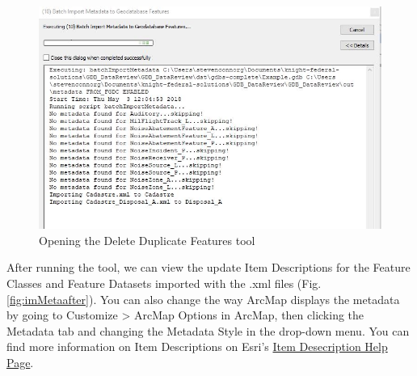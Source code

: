 \documentclass[openany]{book}
\theoremstyle{definition}
\theoremstyle{definition}
\theoremstyle{definition}
\theoremstyle{remark}
\begin{document}
\begin{figure}[H]

{\centering \includegraphics{figures/imMeta-messages} 

}

\caption{Opening the Delete Duplicate Features tool}\label{fig:imMetamessages}
\end{figure}

After running the tool, we can view the update Item Descriptions for the
Feature Classes and Feature Datasets imported with the .xml files (Fig.
\ref{fig:imMetaafter}). You can also change the way ArcMap displays the
metadata by going to Customize \textgreater{} ArcMap Options in ArcMap,
then clicking the Metadata tab and changing the Metadata Style in the
drop-down menu. You can find more information on Item Descriptions on
Esri's
\href{http://desktop.arcgis.com/en/arcmap/latest/map/working-with-arcmap/documenting-items-in-the-catalog-window.htm}{Item
Desecription Help Page}.
\end{document}
